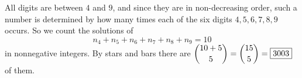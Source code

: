All digits are between $4$ and $9$, and since they are in non-decreasing order, such a number is determined by how many times each of the six digits $4,5,6,7,8,9$ occurs. So we count the solutions of
\[n_4+n_5+n_6+n_7+n_8+n_9=10\]
in nonnegative integers. By stars and bars there are $\dbinom{10+5}{5}=\dbinom{15}{5}=\boxed{3003}$ of them.
